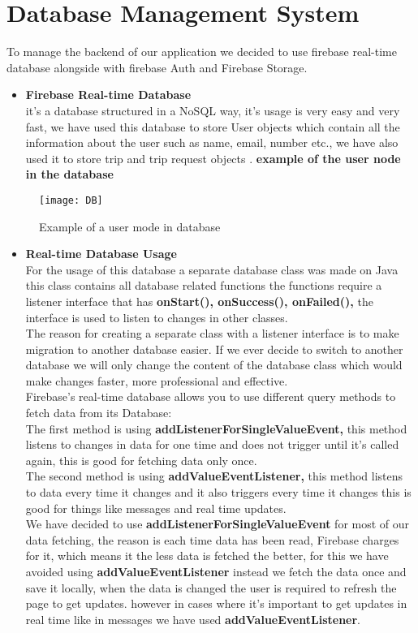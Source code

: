 \section{Database Management System}
To manage the backend of our application we decided to use firebase real-time database alongside with firebase Auth and Firebase Storage. 
\begin{itemize}
\item \textbf{Firebase Real-time Database }\\
it’s a database structured in a NoSQL way, it’s usage is very easy and very fast, we have used this database to store User objects which contain all the information about the user such as name, email, number etc., we have also used it to store trip and trip request objects .
\textbf{example of the user node in the database}
\end{itemize}
\begin{figure}[ht]
\center
\texttt{[image: DB]} 
\caption{Example of a user mode in database}
\label{fig:Example of a user mode in database}
\end{figure}

\begin{itemize}
\item \textbf{Real-time Database Usage }\\
For the usage of this database a separate database class was made on Java this class contains all database related functions the functions require a listener interface that has \textbf{onStart(), onSuccess(), onFailed(),} the interface is used to listen to changes in other classes.
\\ The reason for creating a separate class with a listener interface is to make migration to another database easier. If we ever decide to switch to another database we will only change the content of the database class which would make changes faster, more professional and effective. 
\\ Firebase’s real-time database allows you to use different query methods to fetch data from its Database: 
\\ The first method is using \textbf{addListenerForSingleValueEvent,} this method listens to changes 
in data for one time and does not trigger until it’s called again, this is good for fetching data only once. 
\\ The second method is using \textbf{addValueEventListener,} this method listens to data every time it changes and it also triggers every time it changes this is good for things like messages and real time updates.
\\ We have decided to use \textbf{addListenerForSingleValueEvent} for most of our data fetching, the reason is each time data has been read, Firebase charges for it, which means it the less data is fetched the better, for this we have avoided using\textbf{ addValueEventListener} instead we fetch the data once and save it locally, when the data is changed the user is required to refresh the page to get updates. however in cases where it’s important to get updates in real time like in messages we have used \textbf{addValueEventListener}. 
\end{itemize}

